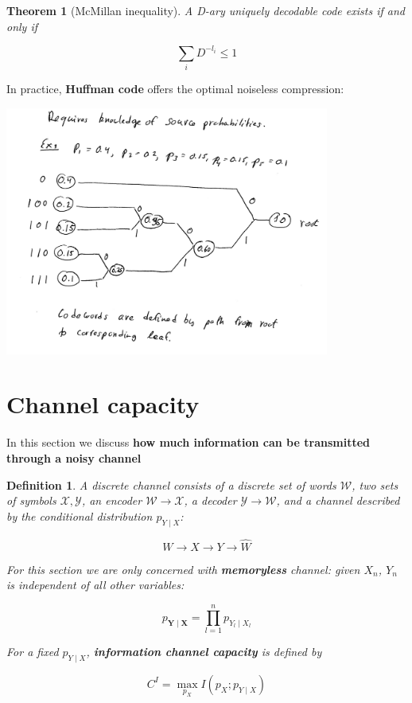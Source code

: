 \documentclass{article}
\newtheorem{definition}{Definition}[section]
\newtheorem{theorem}{Theorem}[section]
\begin{document}
    \begin{theorem}[McMillan inequality]
        A D-ary uniquely decodable code exists if and only if
        
        \begin{equation*}
            \sum_{i}D^{-l_i} \leq 1
        \end{equation*}
    \end{theorem}

    In practice, \textbf{Huffman code} offers the optimal noiseless compression:

    \includegraphics[width=0.8\textwidth]{./img/huffman-example.png}

\section{Channel capacity}
    In this section we discuss \textbf{how much information can be transmitted through a noisy channel}

    \begin{definition}
        A discrete channel consists of a discrete set of words $\mathcal{W}$, two sets of symbols $\mathcal{X}, \mathcal{Y}$, an encoder $\mathcal{W} \rightarrow \mathcal{X}$, a decoder $\mathcal{Y} \rightarrow \mathcal{W}$, and a channel described by the conditional distribution $p_{Y \mid X}$:

        \begin{equation*}
            W \rightarrow X \rightarrow Y \rightarrow \hat{W}
        \end{equation*}

        For this section we are only concerned with \textbf{memoryless} channel: given $X_n$, $Y_n$ is independent of all other variables:

        \begin{equation*}
            p_{\mathbf{Y} \mid \mathbf{X}} = \prod_{l=1}^n p_{Y_l \mid X_l}
        \end{equation*}

        For a fixed $p_{Y \mid X}$, \textbf{information channel capacity} is defined by

        \begin{equation*}
            C^I = \max_{p_X} I(p_X; p_{Y \mid X})
        \end{equation*}
    \end{definition}
\end{document}
